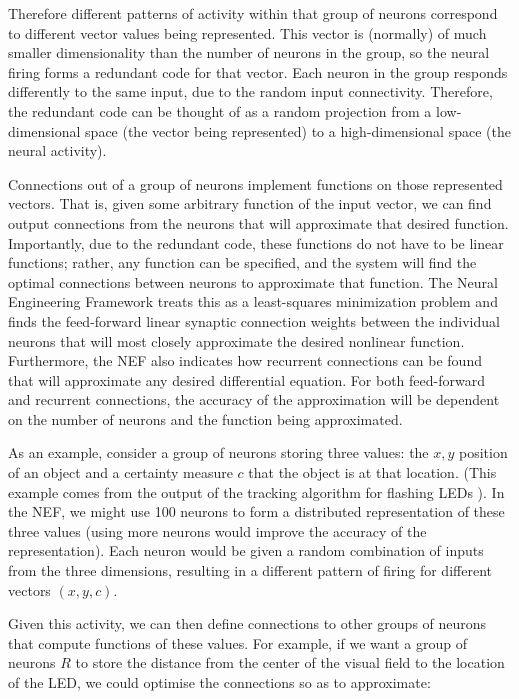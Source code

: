 \documentclass{frontiersSCNS}
\begin{document}
Therefore different patterns of activity within
that group of neurons correspond to different vector values being represented.
This vector is (normally) of much smaller dimensionality than the number of 
neurons in the group, so the neural firing forms a redundant code for that 
vector. Each neuron in the group responds differently to the same input, due
to the random input connectivity. Therefore, the redundant code can be thought of as a 
random projection from a low-dimensional space (the vector being represented) 
to a high-dimensional space (the neural activity). 

Connections out of a group of neurons implement functions on those represented 
vectors. That is, given some arbitrary function of the input vector, we can
find output connections from the neurons that will approximate that desired
function.  Importantly, due to 
the redundant code, these functions do not have to be linear functions; 
rather, any function can be specified, and the system will find the optimal
connections between neurons to approximate that function. The Neural Engineering 
Framework treats this as a least-squares minimization problem and finds the 
feed-forward linear synaptic connection weights between the individual neurons that will 
most closely approximate the desired nonlinear function. Furthermore, the NEF 
also indicates how recurrent connections can be found that will approximate 
any desired differential equation.  For both feed-forward and recurrent 
connections, the accuracy of the approximation will be dependent on the 
number of neurons and the function being approximated. 

As an example, consider a group of neurons storing three values: the $x,y$ 
position of an object and a certainty measure $c$ that the object is at that
location.  (This example comes from the output of the tracking algorithm 
for flashing LEDs \citep{muller2011miniature}).  In the NEF, we might use 100 
neurons to form a distributed representation of these three values 
(using more neurons would improve the accuracy of the representation).  Each
neuron would be given a random combination of inputs from the three dimensions,
resulting in a different pattern of firing for different vectors $(x,y,c)$.

Given this activity, we can then define connections to other groups of neurons
that compute functions of these values. For example, if we want a group of 
neurons $R$ to store the distance from the center of the visual field to the 
location of the LED, we could optimise the connections so
as to approximate: 
 
\end{document}
